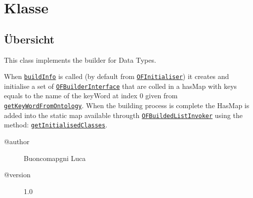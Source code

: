 
\section[OFDataMapperBuilder]{Klasse }\label{ontologyFramework.OFDataMapping.OFDataMapperBuilder-class}
\subsection{Übersicht}
This class implements the builder for Data Types.
 
 When \texttt{\hyperlink{ontologyFramework.OFDataMapping.OFDataMapperBuilder.buildInfo(java.lang.String[],ontologyFramework.OFContextManagement.OWLReferences,ontologyFramework.OFRunning.OFInvokingManager.OFBuildedListInvoker)}{buildInfo}} is called
 (by default from \texttt{\hyperlink{ontologyFramework.OFRunning.OFInitialising.OFInitialiser-class}{OFInitialiser}}) it creates
 and initialise a set of \texttt{\hyperlink{ontologyFramework.OFRunning.OFInitialising.OFBuilderInterface<T>-class}{OFBuilderInterface}} that are colled in a hasMap with keys 
 equals to the name of the keyWord at index 0 given from \texttt{\hyperlink{ontologyFramework.OFDataMapping.ReservatedDataType.KeyWordsMapper.getKeyWordFromOntology(java.lang.String,ontologyFramework.OFContextManagement.OWLReferences)}{getKeyWordFromOntology}}.
 When the building process is complete the HasMap is added into the static map available
 througth \texttt{\hyperlink{ontologyFramework.OFRunning.OFInvokingManager.OFBuildedListInvoker-class}{OFBuildedListInvoker}} using the method: \texttt{\hyperlink{ontologyFramework.OFDataMapping.OFDataMapperBuilder.getInitialisedClasses()}{getInitialisedClasses}}.
\begin{description}
\item[@author] 
Buoncomapgni Luca
\item[@version] 
1.0
\end{description}
